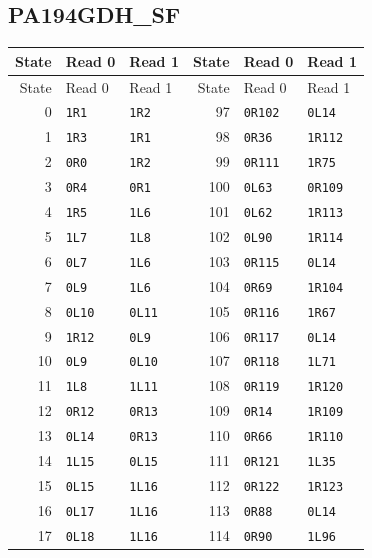 \subsection{PA194GDH\_SF}
\begingroup\small
\begin{longtable}{@{}rll@{\hspace{2em}}rll@{}}
\toprule State & Read 0 & Read 1 & State & Read 0 & Read 1\\\midrule\endfirsthead
\toprule State & Read 0 & Read 1 & State & Read 0 & Read 1\\\midrule\endhead
0 & \texttt{1R1} & \texttt{1R2} & 97 & \texttt{0R102} & \texttt{0L14}\\
1 & \texttt{1R3} & \texttt{1R1} & 98 & \texttt{0R36} & \texttt{1R112}\\
2 & \texttt{0R0} & \texttt{1R2} & 99 & \texttt{0R111} & \texttt{1R75}\\
3 & \texttt{0R4} & \texttt{0R1} & 100 & \texttt{0L63} & \texttt{0R109}\\
4 & \texttt{1R5} & \texttt{1L6} & 101 & \texttt{0L62} & \texttt{1R113}\\
5 & \texttt{1L7} & \texttt{1L8} & 102 & \texttt{0L90} & \texttt{1R114}\\
6 & \texttt{0L7} & \texttt{1L6} & 103 & \texttt{0R115} & \texttt{0L14}\\
7 & \texttt{0L9} & \texttt{1L6} & 104 & \texttt{0R69} & \texttt{1R104}\\
8 & \texttt{0L10} & \texttt{0L11} & 105 & \texttt{0R116} & \texttt{1R67}\\
9 & \texttt{1R12} & \texttt{0L9} & 106 & \texttt{0R117} & \texttt{0L14}\\
10 & \texttt{0L9} & \texttt{0L10} & 107 & \texttt{0R118} & \texttt{1L71}\\
11 & \texttt{1L8} & \texttt{1L11} & 108 & \texttt{0R119} & \texttt{1R120}\\
12 & \texttt{0R12} & \texttt{0R13} & 109 & \texttt{0R14} & \texttt{1R109}\\
13 & \texttt{0L14} & \texttt{0R13} & 110 & \texttt{0R66} & \texttt{1R110}\\
14 & \texttt{1L15} & \texttt{0L15} & 111 & \texttt{0R121} & \texttt{1L35}\\
15 & \texttt{0L15} & \texttt{1L16} & 112 & \texttt{0R122} & \texttt{1R123}\\
16 & \texttt{0L17} & \texttt{1L16} & 113 & \texttt{0R88} & \texttt{0L14}\\
17 & \texttt{0L18} & \texttt{1L16} & 114 & \texttt{0R90} & \texttt{1L96}\\

\end{longtable}
